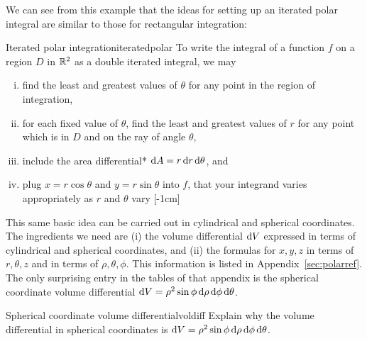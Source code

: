 \documentclass[prettycode,shellescape]{watsonbook}
\begin{document}
We can see from this example that the ideas for setting up an iterated
polar integral are similar to those for 
rectangular integration:
\begin{obs}{Iterated polar integration}{iteratedpolar}
  To write the integral of a function $f$ on a region $D$ in $\mathbb{R}^2$
  as a double iterated integral, we may 
  \begin{enumerate}[(i), itemsep = 6pt, topsep = 5pt, leftmargin=12pt]
  \item find the least and greatest values of $\theta$ for any point in
    the region of integration, 
  \item for each fixed value of $\theta$, find the least and greatest
    values of $r$ for any point which is in $D$ and on the ray of angle
    $\theta$, 
  \item include the area differential* $\mathrm{d} A = r \, {\mathrm{d}}r \,
    \mathrm{d}\theta$, and 
  \item plug $x = r \cos\theta$ and $y=r\sin \theta$ into $f$, 
    that your integrand varies appropriately as $r$ and $\theta$ vary 
    [-1cm]
  \end{enumerate}
\end{obs}

This same basic idea can be carried out in cylindrical and spherical
coordinates. The ingredients we need are (i) the volume differential
$\mathrm{d} V$ expressed in terms of cylindrical and spherical coordinates, and
(ii) the formulas for $x, y, z$ in terms of $r, \theta, z$ and in
terms of $\rho, \theta, \phi$. This information is listed in
Appendix~\ref{sec:polarref}. The only surprising entry in the tables
of that appendix is the spherical coordinate volume differential $\mathrm{d} V =
\rho^2 \sin \phi \, {\mathrm{d}}\rho \, {\mathrm{d}} \phi \, \mathrm{d}\theta$.

\begin{example}{Spherical coordinate volume differential}{voldiff}
  Explain why the volume differential in spherical coordinates is $\mathrm{d} V =
  \rho^2 \sin \phi \, {\mathrm{d}}\rho \, {\mathrm{d}} \phi \, \mathrm{d}\theta$. 
\end{example}
\end{document}
